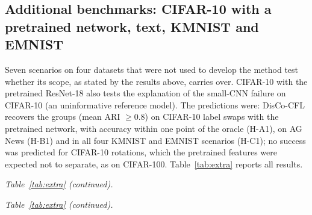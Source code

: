 \subsection{Additional benchmarks: CIFAR-10 with a pretrained network, text, KMNIST and EMNIST}\label{sec:extra}
Seven scenarios on four datasets that were not used to develop the method test whether its scope, as stated by the results above, carries over. CIFAR-10 with the pretrained ResNet-18 also tests the explanation of the small-CNN failure on CIFAR-10 (an uninformative reference model). The predictions were: DisCo-CFL recovers the groups (mean ARI $\ge0.8$) on CIFAR-10 label swaps with the pretrained network, with accuracy within one point of the oracle (H-A1), on AG News (H-B1) and in all four KMNIST and EMNIST scenarios (H-C1); no success was predicted for CIFAR-10 rotations, which the pretrained features were expected not to separate, as on CIFAR-100. Table~\ref{tab:extra} reports all results.

\begin{tableorg}[!htbp]
\centering
\caption{Additional benchmarks (40 clients, 5 seeds; columns as in Table~\ref{tab:main}). CIFAR-10 (ResNet): pretrained ResNet-18 as in Section~\ref{sec:setup}. PACFL and FedDAG-C need image inputs and are not run on AG News.}\label{tab:extra}

\end{tableorg}

\begin{tableorg}[!htbp]
\centering
\noindent\textit{Table~\ref{tab:extra} (continued).}\par\smallskip

\end{tableorg}

\begin{tableorg}[!htbp]
\centering
\noindent\textit{Table~\ref{tab:extra} (continued).}\par\smallskip

\end{tableorg}

